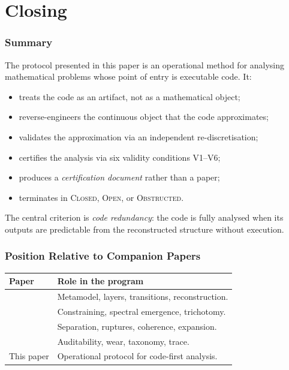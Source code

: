 \documentclass[11pt,a4paper]{article}
\theoremstyle{definition}
\theoremstyle{plain}
\newcommand{\STCLOSED}{\textsc{Closed}}
\newcommand{\STOPEN}{\textsc{Open}}
\newcommand{\STOBSTR}{\textsc{Obstructed}}
\begin{document}
\part{Closing}
\label{part:closing}

\section{Summary}

The protocol presented in this paper is an operational method for
analysing mathematical problems whose point of entry is executable
code. It:
\begin{itemize}
  \item treats the code as an artifact, not as a mathematical
        object;
  \item reverse-engineers the continuous object that the code
        approximates;
  \item validates the approximation via an independent
        re-discretisation;
  \item certifies the analysis via six validity conditions
        V1--V6;
  \item produces a \emph{certification document} rather than a
        paper;
  \item terminates in \STCLOSED, \STOPEN, or \STOBSTR.
\end{itemize}

The central criterion is \emph{code redundancy}: the code is fully
analysed when its outputs are predictable from the reconstructed
structure without execution.

\section{Position Relative to Companion Papers}

\begin{center}
\begin{tabular}{l l}
  \toprule
  Paper & Role in the program \\
  \midrule
  \cite{framework} & Metamodel, layers, transitions, reconstruction. \\
  \cite{paperI}    & Constraining, spectral emergence, trichotomy. \\
  \cite{paperII}   & Separation, ruptures, coherence, expansion. \\
  \cite{paperIII}  & Auditability, wear, taxonomy, trace. \\
  This paper       & Operational protocol for code-first analysis. \\
  \bottomrule
\end{tabular}
\end{center}
\end{document}
